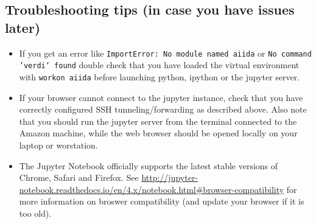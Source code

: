 \subsection*{Troubleshooting tips (in case you have issues later)} 
\begin{itemize}
\item If you get an error like \texttt{ImportError: No module named aiida} or \texttt{No command 'verdi' found} double check that you have loaded the virtual environment with \texttt{workon aiida} before launching python, ipython or the jupyter server.
\item If your browser cannot connect to the jupyter instance, check that you have correctly configured SSH tunneling/forwarding as described above. Also note that you should run the jupyter server from the terminal connected to the Amazon machine, while the web browser should be opened locally on your laptop or worstation.
\item The Jupyter Notebook officially supports the latest stable versions of Chrome, Safari and Firefox. See \url{http://jupyter-notebook.readthedocs.io/en/4.x/notebook.html#browser-compatibility} for more information on broswer compatibility (and update your browser if it is too old).
\end{itemize}



